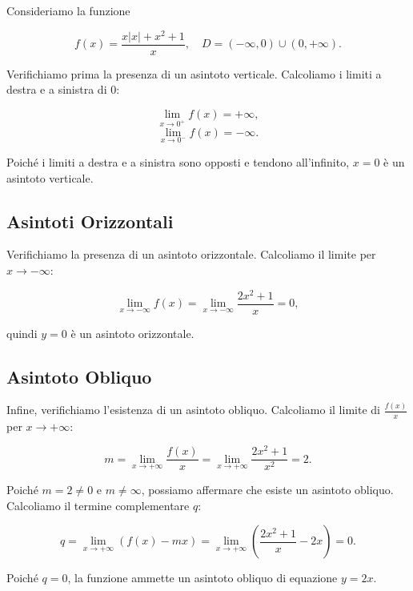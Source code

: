 \documentclass{article}
\begin{document}
Consideriamo la funzione

\[
f(x) = \frac{x |x| + x^2 + 1}{x}, \quad D = (-\infty, 0) \cup (0, +\infty).
\]

Verifichiamo prima la presenza di un asintoto verticale. Calcoliamo i limiti a destra e a sinistra di 0:

\[
\lim_{x \to 0^+} f(x) = +\infty,
\]
\[
\lim_{x \to 0^-} f(x) = -\infty.
\]

Poiché i limiti a destra e a sinistra sono opposti e tendono all'infinito, \( x = 0 \) è un asintoto verticale.

\subsection*{Asintoti Orizzontali}

Verifichiamo la presenza di un asintoto orizzontale. Calcoliamo il limite per \( x \to -\infty \):

\[
\lim_{x \to -\infty} f(x) = \lim_{x \to -\infty} \frac{2x^2 + 1}{x} = 0,
\]

quindi \( y = 0 \) è un asintoto orizzontale.

\subsection*{Asintoto Obliquo}

Infine, verifichiamo l'esistenza di un asintoto obliquo. Calcoliamo il limite di \( \frac{f(x)}{x} \) per \( x \to +\infty \):

\[
m = \lim_{x \to +\infty} \frac{f(x)}{x} = \lim_{x \to +\infty} \frac{2x^2 + 1}{x^2} = 2.
\]

Poiché \( m = 2 \neq 0 \) e \( m \neq \infty \), possiamo affermare che esiste un asintoto obliquo. Calcoliamo il termine complementare \( q \):

\[
q = \lim_{x \to +\infty} \left( f(x) - mx \right) = \lim_{x \to +\infty} \left( \frac{2x^2 + 1}{x} - 2x \right) = 0.
\]

Poiché \( q = 0 \), la funzione ammette un asintoto obliquo di equazione \( y = 2x \).
\end{document}

